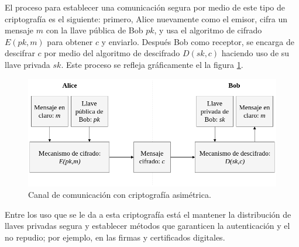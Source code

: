 El proceso para establecer una comunicación segura por medio de este tipo
de criptografía es el siguiente: primero, Alice nuevamente como el emisor,
cifra un mensaje $m$ con la llave pública de Bob $pk$, y usa el algoritmo de
cifrado $E(pk,m)$ para obtener $c$ y enviarlo. Después Bob como receptor,
se encarga de descifrar $c$ por medio del algoritmo de descifrado
$D(sk,c)$ haciendo uso de su llave privada $sk$. Este proceso se refleja
gráficamente el la figura \ref{cripto_asimetrica}.

\begin{figure}
  \begin{center}
    \includegraphics[width=0.8\linewidth]{diagramas/cripto_asimetrica.png}
    \caption{Canal de comunicación con criptografía asimétrica.}
    \label{cripto_asimetrica}
  \end{center}
\end{figure}

Entre los uso que se le da a esta criptografía está el mantener la
distribución de llaves privadas segura y establecer métodos que garanticen
la autenticación y el no repudio; por ejemplo, en las firmas y
certificados digitales.




